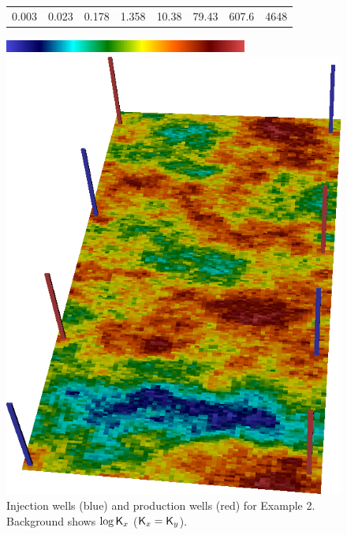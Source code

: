 \documentclass[twocolumn,numbook]{svjour3}          %
\begin{document}
%
\begin{figure}[ht]
\begin{center}
     \begin{tabular}{cccccccc}
      0.003 &  0.023 & 0.178 & 1.358 & 10.38 & 79.43 & 607.6 &4648
      \end{tabular}
      \includegraphics[width=8cm, height=0.5cm]{VanEssenModelPermeabilityMapColorBar.png}
       
       \medskip

       \includegraphics[totalheight=3.2in]{SPE10TopModelPermeabilityMapConstantRotated.png} %


\end{center}
     \caption{Injection wells (blue) and production wells (red) for Example 2. Background shows $\log \mathsf{K}_x$ ($ \mathsf{K}_x = \mathsf{K}_y$).}
  \label{fig:PermeabilityMapAndWellsSpe10Top}
\end{figure}
%
\end{document}
